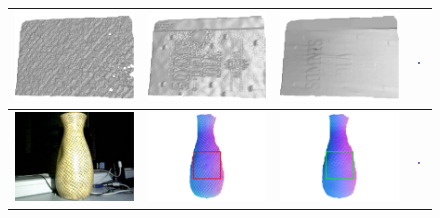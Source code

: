 \begin{figure}[!ht]
{\begin{tabular}{c|c c c}
   \includegraphics[height = 0.19\linewidth]{figures/result/robust_folder_shape_init.pdf} 
   &
   \includegraphics[height = 0.19\linewidth]{figures/result/rgbd_folder_shape.pdf} &
   \includegraphics[height = 0.19\linewidth]{figures/result/robust_folder_shape.pdf}&
   \includegraphics[width=0.17\textwidth]{figures/result/robust_folder_normal_crop.png}
   \\
\hline
   \includegraphics[height = 0.19\linewidth]{figures/result/robust_vase_rgb.pdf} 
   &
   \includegraphics[height = 0.19\linewidth]{figures/result/rgbd_vase_normal_detail.pdf} &
   \includegraphics[height = 0.19\linewidth]{figures/result/robust_vase_normal_detail.pdf}&
   \includegraphics[width=0.17\textwidth]{figures/result/rgbd_vase_normal_crop.png}
    \\


\end{tabular}}
\end{figure}
